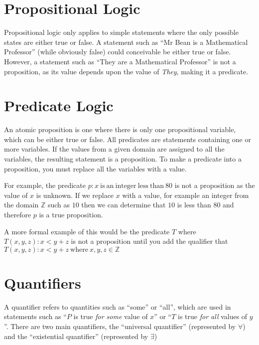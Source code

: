 
\section*{Propositional Logic}

Propositional logic only applies to simple statements where the only possible states are either true or false. A
 statement such as ``Mr Bean is a Mathematical Professor'' (while obviously false) could conceivable be either true or
 false. However, a statement such as ``They are a Mathematical Professor'' is not a proposition, as its value depends
 upon the value of \textit{They}, making it a predicate.

\section*{Predicate Logic}

An atomic proposition is one where there is only one propositional variable, which can be either true or false. All
 predicates are statements containing one or more variables. If the values from a given domain are assigned to all the
 variables, the resulting statement is a proposition. To make a predicate into a proposition, you must replace all the
 variables with a value.

For example, the predicate $p : x \mathrm{\ is\ an\ integer\ less\ than\ } 80$ is not a proposition as the value of $x$
 is unknown. If we replace $x$ with a value, for example an integer from the domain $\mathbb{Z}$ such as $10$ then we
 can determine that $10$ is less than $80$ and therefore $p$ is a true proposition.

A more formal example of this would be the predicate $T$ where $T(x,y,z) : x < y + z$ is not a proposition until you add
 the qualifier that $T(x,y,z) : x < y + z \mathrm{\ where\ } x,y,z \in \mathbb{Z}$

\section*{Quantifiers}

A quantifier refers to quantities such as ``some'' or ``all'', which are used in statements such as ``$P$ is true
 \textit{for some} value of $x$'' or ``$T$ is true \textit{for all} values of $y$''. There are two main quantifiers,
 the ``universal quantifier'' (represented by $\forall$) and the ``existential quantifier'' (represented by $\exists$)

